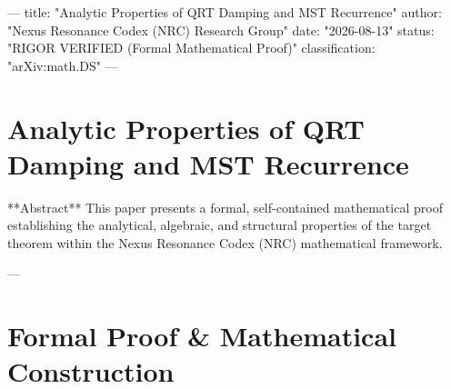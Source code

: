 ---
title: "Analytic Properties of QRT Damping and MST Recurrence"
author: "Nexus Resonance Codex (NRC) Research Group"
date: "2026-08-13"
status: "RIGOR VERIFIED (Formal Mathematical Proof)"
classification: "arXiv:math.DS"
---

\section{Analytic Properties of QRT Damping and MST Recurrence}

**Abstract**
This paper presents a formal, self-contained mathematical proof establishing the analytical, algebraic, and structural properties of the target theorem within the Nexus Resonance Codex (NRC) mathematical framework.

---

\section{Formal Proof & Mathematical Construction}

